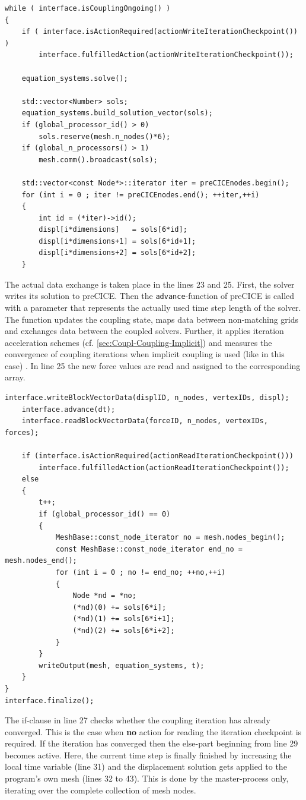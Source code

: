 \begin{lstlisting}[caption=preCICE main while-loop part 1,label=lst:preCICEint4a,keepspaces=true,name=while-loop]
while ( interface.isCouplingOngoing() )
{
	if ( interface.isActionRequired(actionWriteIterationCheckpoint()) )
		interface.fulfilledAction(actionWriteIterationCheckpoint());

	equation_systems.solve();

	std::vector<Number> sols;
	equation_systems.build_solution_vector(sols);
	if (global_processor_id() > 0)
		sols.reserve(mesh.n_nodes()*6);
	if (global_n_processors() > 1)
		mesh.comm().broadcast(sols);

	std::vector<const Node*>::iterator iter = preCICEnodes.begin();
	for (int i = 0 ; iter != preCICEnodes.end(); ++iter,++i)
	{
		int id = (*iter)->id();
		displ[i*dimensions]   = sols[6*id];
		displ[i*dimensions+1] = sols[6*id+1];
		displ[i*dimensions+2] = sols[6*id+2];
	}
\end{lstlisting}
   The actual data exchange is taken place in the lines 23 and 25. First, the solver writes its solution to preCICE. Then the \texttt{advance}-function of preCICE is called with a parameter that represents the actually used time step length of the solver. The function updates the coupling state, maps data between non-matching grids and exchanges data between the coupled solvers. Further, it applies iteration acceleration schemes (cf. \ref{sec:Coupl-Coupling-Implicit}) and measures the convergence of coupling iterations when implicit coupling is used (like in this case) \cite{gatzhammer2015efficient}. In line 25 the new force values are read and assigned to the corresponding array.

\begin{lstlisting}[caption=preCICE main while-loop part 2,label=lst:preCICEint4b,keepspaces=true,name=while-loop]
	interface.writeBlockVectorData(displID, n_nodes, vertexIDs, displ);
	interface.advance(dt);
	interface.readBlockVectorData(forceID, n_nodes, vertexIDs, forces);

	if (interface.isActionRequired(actionReadIterationCheckpoint()))
		interface.fulfilledAction(actionReadIterationCheckpoint());
	else
	{
		t++;
		if (global_processor_id() == 0)
		{
			MeshBase::const_node_iterator no = mesh.nodes_begin();
			const MeshBase::const_node_iterator end_no = mesh.nodes_end();
			for (int i = 0 ; no != end_no; ++no,++i)
			{
				Node *nd = *no;
				(*nd)(0) += sols[6*i];
				(*nd)(1) += sols[6*i+1];
				(*nd)(2) += sols[6*i+2];
			}
		}
		writeOutput(mesh, equation_systems, t);
	}
}
interface.finalize();
\end{lstlisting}
   The if-clause in line 27 checks whether the coupling iteration has already converged. This is the case when \textbf{no} action for reading the iteration checkpoint is required. If the iteration has converged then the else-part beginning from line 29 becomes active. Here, the current time step is finally finished by increasing the local time variable (line 31) and the displacement solution gets applied to the program's own mesh (lines 32 to 43). This is done by the master-process only, iterating over the complete collection of mesh nodes. %
   
